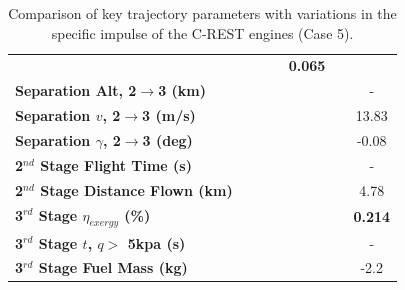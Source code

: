 \begin{table}[ht!]
\begin{tabular}{l c c c c c c}
		& \textbf{\secondExergyEffIspStandardNoReturn}
		& \textbf{\secondExergyEffIspOneHundredFiveNoReturn}
		& \textbf{\secondExergyEffIspOneHundredTenNoReturn}
		& \textbf{0.065}
		\\
		\textbf{Separation Alt, 2$\rightarrow$3 (km)}
		& \secondthirdSeparationAltIspNinetyNoReturn
		& \secondthirdSeparationAltIspNinetyFiveNoReturn
		& \secondthirdSeparationAltIspStandardNoReturn
		& \secondthirdSeparationAltIspOneHundredFiveNoReturn
		& \secondthirdSeparationAltIspOneHundredTenNoReturn
		& -
		\\
		\textbf{Separation $v$, 2$\rightarrow$3 (m/s)}
		& \secondthirdSeparationvIspNinetyNoReturn
		& \secondthirdSeparationvIspNinetyFiveNoReturn
		& \secondthirdSeparationvIspStandardNoReturn
		& \secondthirdSeparationvIspOneHundredFiveNoReturn
		& \secondthirdSeparationvIspOneHundredTenNoReturn
		&13.83
		\\
		\textbf{Separation $\gamma$, 2$\rightarrow$3 (deg)}
		& \secondthirdSeparationgammaIspNinetyNoReturn
		& \secondthirdSeparationgammaIspNinetyFiveNoReturn
		& \secondthirdSeparationgammaIspStandardNoReturn
		& \secondthirdSeparationgammaIspOneHundredFiveNoReturn
		& \secondthirdSeparationgammaIspOneHundredTenNoReturn
		&-0.08
		\\
		\textbf{2$^{nd}$ Stage Flight Time (s)}
		& \secondFlightTimeIspNinetyNoReturn
		& \secondFlightTimeIspNinetyFiveNoReturn
		& \secondFlightTimeIspStandardNoReturn
		& \secondFlightTimeIspOneHundredFiveNoReturn
		& \secondFlightTimeIspOneHundredTenNoReturn
		& -
		\\
		\textbf{2$^{nd}$ Stage Distance Flown (km)}
		& \SecondDistIspNinetyNoReturn
		& \SecondDistIspNinetyFiveNoReturn
		& \SecondDistIspStandardNoReturn
		& \SecondDistIspOneHundredFiveNoReturn
		& \SecondDistIspOneHundredTenNoReturn
		&4.78
		\\
		\hline 
		\textbf{3$^{rd}$ Stage $\eta_{exergy}$ (\%)}
		& \textbf{\thirddExergyEffIspNinetyNoReturn}
		& \textbf{\thirddExergyEffIspNinetyFiveNoReturn}
		& \textbf{\thirddExergyEffIspStandardNoReturn}
		& \textbf{\thirddExergyEffIspOneHundredFiveNoReturn}
		& \textbf{\thirddExergyEffIspOneHundredTenNoReturn}
		& \textbf{0.214}
		\\
		\textbf{3$^{rd}$ Stage $t$, $q >$ 5kpa (s)}
		& \thirdqOverFiveIspNinetyNoReturn
		& \thirdqOverFiveIspNinetyFiveNoReturn
		& \thirdqOverFiveIspStandardNoReturn
		& \thirdqOverFiveIspOneHundredFiveNoReturn
		& \thirdqOverFiveIspOneHundredTenNoReturn
		& -
		\\
		\textbf{3$^{rd}$ Stage Fuel Mass (kg)}
		& \thirdmFuelIspNinetyNoReturn
		& \thirdmFuelIspNinetyFiveNoReturn
		& \thirdmFuelIspStandardNoReturn
		& \thirdmFuelIspOneHundredFiveNoReturn
		& \thirdmFuelIspOneHundredTenNoReturn
		&-2.2
		\\
		\hline 
	\end{tabular} 

	
	\caption{Comparison of key trajectory parameters with variations in the specific impulse of the C-REST engines (Case 5).}
	\label{tab:comparison30}
\end{table}

